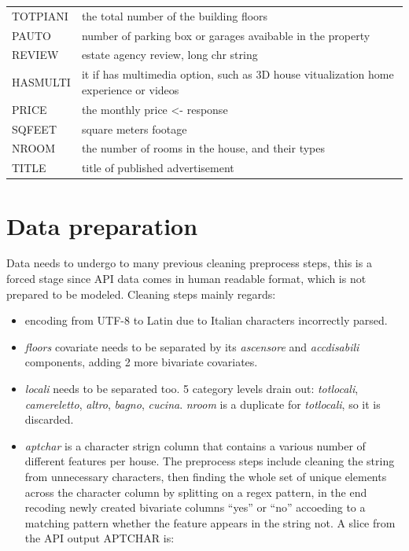 \documentclass[
  12pt,
  a4paper,
  oneside]{book}
\providecommand{\tightlist}{%
  \setlength{\itemsep}{0pt}\setlength{\parskip}{0pt}}
\theoremstyle{definition}
\theoremstyle{definition}
\theoremstyle{definition}
\theoremstyle{remark}
\begin{document}
\begin{longtable}{ll}
\addlinespace
TOTPIANI & the total number of the building floors\\
PAUTO & number of parking box or garages avaibable in the property\\
REVIEW & estate agency review, long chr string\\
HASMULTI & it if has multimedia option, such as 3D house vitualization home experience or videos\\
PRICE & the monthly price <- response\\
\addlinespace
SQFEET & square meters footage\\
NROOM & the number of rooms in the house, and their types\\
TITLE & title of published advertisement\\
\bottomrule
\end{longtable}

\hypertarget{prep}{%
\section{Data preparation}\label{prep}}

Data needs to undergo to many previous cleaning preprocess steps, this is a forced stage since API data comes in human readable format, which is not prepared to be modeled. Cleaning steps mainly regards:

\begin{itemize}
\tightlist
\item
  encoding from UTF-8 to Latin due to Italian characters incorrectly parsed.
\item
  \emph{floors} covariate needs to be separated by its \emph{ascensore} and \emph{accdisabili} components, adding 2 more bivariate covariates.
\item
  \emph{locali} needs to be separated too. 5 category levels drain out: \emph{totlocali}, \emph{camereletto}, \emph{altro}, \emph{bagno}, \emph{cucina}. \emph{nroom} is a duplicate for \emph{totlocali}, so it is discarded.
\item
  \emph{aptchar} is a character strign column that contains a various number of different features per house. The preprocess steps include cleaning the string from unnecessary characters, then finding the whole set of unique elements across the character column by splitting on a regex pattern, in the end recoding newly created bivariate columns ``yes'' or ``no'' accoeding to a matching pattern whether the feature appears in the string not. A slice from the API output APTCHAR is:
\end{itemize}
\end{document}
